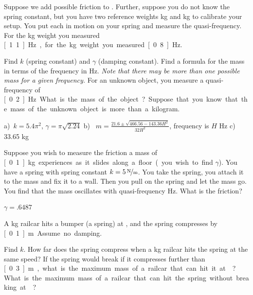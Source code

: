 \begin{exercise}
Suppose we add possible friction to .
Further, suppose you do not know the spring constant, but you have
two reference weights \unit[1]{kg} and \unit[2]{kg} to calibrate your setup.
You put each in motion on your spring and measure the
quasi-frequency.  For the \unit[1]{kg}
weight you measured \unit[1.1]{Hz}, for the \unit[2]{kg} weight you
measured \unit[0.8]{Hz}.
\begin{tasks}
\task Find $k$ (spring constant) and $\gamma$ (damping constant).
\task Find a formula for the mass in terms of the frequency in Hz.  \emph{Note that
there may be more than one possible mass for a given frequency.}
\task For an unknown object, you measure a quasi-frequency of \unit[0.2]{Hz}. What is the mass of the
object?  Suppose that you know that the mass of the unknown object
is more than a kilogram.
\end{tasks}
\end{exercise}
\comboSol{%
}
{%
a)~$k =5.4\pi^2$, $\gamma=\pi\sqrt{2.24}$ \quad
b)~ $m = \frac{21.6 \pm \sqrt{466.56 - 143.36H^2}}{32H^2}$, frequency is $H$ Hz \quad
c)~ 33.65 kg
}

\begin{exercise}
Suppose you wish to measure the friction a mass of \unit[0.1]{kg} experiences
as it slides along a floor (you wish to find $\gamma$).  You have a spring with
spring constant $k=\unitfrac[5]{N}{m}$.  You take the spring, you attach it
to the mass and fix it to a wall.  Then you pull on the spring and let the
mass go.  You find that the mass oscillates with quasi-frequency \unit[1]{Hz}.
What is the friction?
\end{exercise}
\comboSol{%
}
{%
$\gamma = .6487$
}

\begin{exercise}\ansMark%
\pagebreak[2]
A \unit[5000]{kg} railcar hits a bumper (a spring) at ,
and the spring compresses by \unit[0.1]{m}.  Assume no damping.
\begin{tasks}
\task Find $k$.
\task How far does the spring compress when a
\unit[10000]{kg} railcar hits the spring at the same speed?
\task If the spring
would break if it compresses further than \unit[0.3]{m}, what is the maximum
mass of a railcar that can hit it at ?
\task What is
the maximum mass of a railcar that can hit the spring without breaking
at ?
\end{tasks}
\end{exercise}

